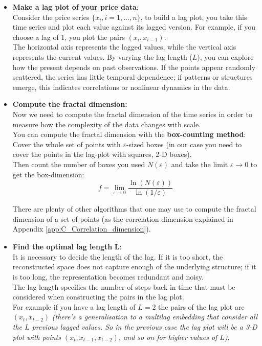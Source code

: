 \begin{itemize}
    \item \textbf{Make a lag plot of your price data}:\\
    Consider the price series $\{x_i,i=1,...,n\}$, to build a lag plot, you take this time series and plot each value against its lagged version. For example, if you choose a lag of 1, you plot the pairs $(x_i,x_{i-1})$.\\
The horizontal axis represents the lagged values, while the vertical axis represents the current values. By varying the lag length ($L$), you can explore how the present depends on past observations. If the points appear randomly scattered, the series has little temporal dependence; if patterns or structures emerge, this indicates correlations or nonlinear dynamics in the data.
    \item \textbf{Compute the fractal dimension:}\\
    Now we need to compute the fractal dimension of the time series in order to measure how the complexity of the data changes with scale. \\
    You can compute the fractal dimension with the \textbf{box-counting method}: \\

    Cover the whole set of points with $\varepsilon$-sized boxes (in our case you need to cover the points in the lag-plot with squares, 2-D boxes).\\
    Then count the number of boxes you used $N(\varepsilon)$ and take the limit $\varepsilon \to 0$ to get the box-dimension:
    \begin{equation*}
         f=\lim_{\varepsilon \rightarrow 0} \frac{\ln(N(\varepsilon))}{\ln(1/\varepsilon)}    
    \end{equation*}
    
    There are plenty of other algorithms that one may use to compute the fractal dimension of a set of points (as the correlation dimension explained in Appendix \ref{app:C_Correlation_dimension}).
    \item \textbf{Find the optimal lag length} $\boldsymbol{\tilde{L}}$:\\
    It is necessary to decide the length of the lag. If it is too short, the reconstructed space does not capture enough of the underlying structure; if it is too long, the representation becomes redundant and noisy.\\
    
    
    The lag length specifies the number of steps back in time that must be considered when constructing the pairs in the lag plot. \\
    For example if you have a lag length of $L=2$ the pairs of the lag plot are $(x_t,x_{t-2})$ \textit{(there's a generalisation to a multilag embedding that consider all the $L$ previous lagged values. So in the previous case the lag plot will be a 3-D plot with points $(x_t,x_{t-1},x_{t-2})$, and so on for higher values of $L$)}.\\


\end{itemize}
